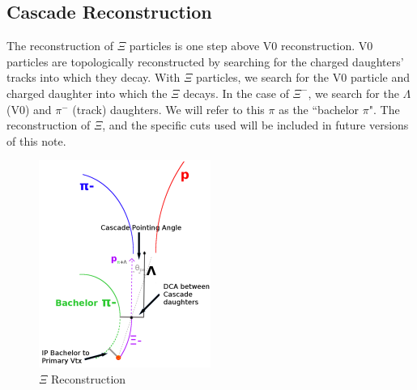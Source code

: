 \documentclass[../AnalysisNoteJBuxton.tex]{subfiles}
\begin{document}
\subsection{Cascade Reconstruction}
\label{CascadeReconstruction}

The reconstruction of $\Xi$ particles is one step above V0 reconstruction.  V0 particles are topologically reconstructed by searching for the charged daughters' tracks into which they decay.  With $\Xi$ particles, we search for the V0 particle and charged daughter into which the $\Xi$ decays.  In the case of $\Xi^{-}$, we search for the $\Lambda$ (V0) and $\pi^{-}$ (track) daughters.  We will refer to this $\pi$ as the ``bachelor $\pi$".  The reconstruction of $\Xi$, and the specific cuts used will be included in future versions of this note.

\begin{figure}[h]
  \centering
  \includegraphics[width=0.5\textwidth]{3_DataSelection/Figures/XiCuts.pdf}
  \caption[$\Xi$ Reconstruction]{$\Xi$ Reconstruction}
  \label{fig:XiReconstruction}
\end{figure}
\end{document}
